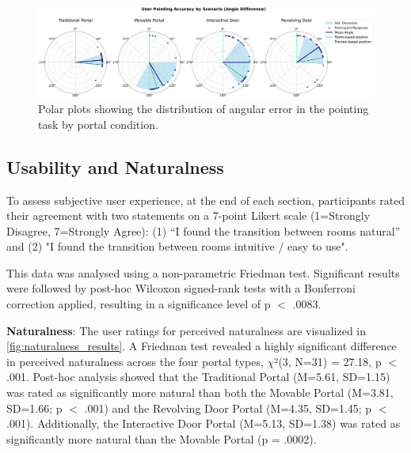\begin{figure}[t]
    \centering
    \includegraphics[width=\textwidth]{NOVAthesisFiles/Images/graphs/angle_difference_plot_with_stats.pdf}
    \caption[Polar plots of the distribution of angular error in the pointing task by portal condition.]
    {Polar plots showing the distribution of angular error in the pointing task by portal condition.}
    \label{fig:angle_plot}
\end{figure}

\subsection{Usability and Naturalness}
\label{sec:usability-naturalness}

To assess subjective user experience, at the end of each section, participants rated their agreement with two statements on a 7-point Likert 
scale (1=Strongly Disagree, 7=Strongly Agree): (1) “I found the transition between rooms natural” and 
(2) "I found the transition between rooms intuitive / easy to use". 


This data was analysed using a non-parametric Friedman test. Significant results were followed by post-hoc Wilcoxon signed-rank tests with a Bonferroni 
correction applied, resulting in a significance level of p $<$ .0083.

\textbf{Naturalness}: The user ratings for perceived naturalness are visualized in \autoref{fig:naturalness_results}. 
A Friedman test revealed a highly significant difference in perceived naturalness across the four portal types, $\chi$²(3, N=31) = 27.18, 
p $<$ .001. Post-hoc analysis showed that the Traditional Portal (M=5.61, SD=1.15) was rated as significantly more natural than both the 
Movable Portal (M=3.81, SD=1.66; p $<$ .001) and the Revolving Door Portal (M=4.35, SD=1.45; p $<$ .001). Additionally, 
the Interactive Door Portal (M=5.13, SD=1.38) was rated as significantly more natural than the Movable Portal (p = .0002).

